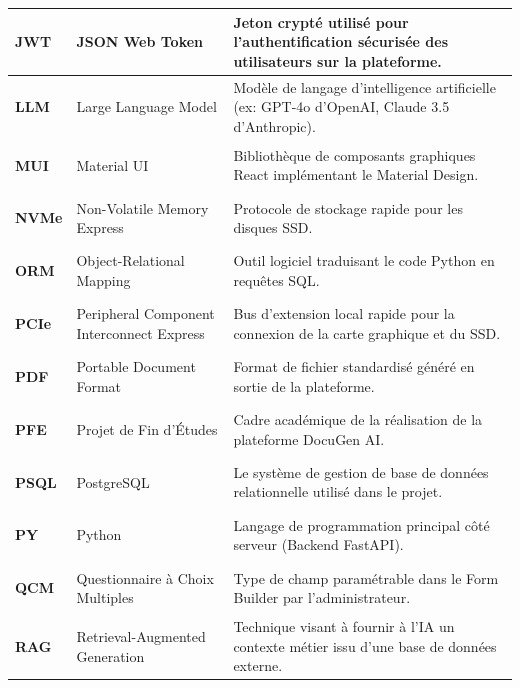 \documentclass[12pt, a4paper]{report}
\begin{document}
\begin{longtable}{|p{2.5cm}|p{5.5cm}|p{\dimexpr\textwidth-8.8cm}|}
    \hypertarget{acr:18}{}\textbf{JWT} & JSON Web Token & Jeton crypté utilisé pour l'authentification sécurisée des utilisateurs sur la plateforme. \\ \hline
    
    \hypertarget{acr:19}{}\textbf{LLM} & Large Language Model & Modèle de langage d'intelligence artificielle (ex: GPT-4o d'OpenAI, Claude 3.5 d'Anthropic). \\ \hline
    
    \hypertarget{acr:20}{}\textbf{MUI} & Material UI & Bibliothèque de composants graphiques React implémentant le Material Design. \\ \hline
    
    \hypertarget{acr:21}{}\textbf{NVMe} & Non-Volatile Memory Express & Protocole de stockage rapide pour les disques SSD. \\ \hline
    
    \hypertarget{acr:22}{}\textbf{ORM} & Object-Relational Mapping & Outil logiciel traduisant le code Python en requêtes SQL. \\ \hline
    
    \hypertarget{acr:23}{}\textbf{PCIe} & Peripheral Component Interconnect Express & Bus d'extension local rapide pour la connexion de la carte graphique et du SSD. \\ \hline
    
    \hypertarget{acr:24}{}\textbf{PDF} & Portable Document Format & Format de fichier standardisé généré en sortie de la plateforme. \\ \hline
    
    \hypertarget{acr:25}{}\textbf{PFE} & Projet de Fin d'Études & Cadre académique de la réalisation de la plateforme DocuGen AI. \\ \hline
    
    \hypertarget{acr:26}{}\textbf{PSQL} & PostgreSQL & Le système de gestion de base de données relationnelle utilisé dans le projet. \\ \hline
    
    \hypertarget{acr:27}{}\textbf{PY} & Python & Langage de programmation principal côté serveur (Backend FastAPI). \\ \hline
    
    \hypertarget{acr:28}{}\textbf{QCM} & Questionnaire à Choix Multiples & Type de champ paramétrable dans le Form Builder par l'administrateur. \\ \hline
    
    \hypertarget{acr:29}{}\textbf{RAG} & Retrieval-Augmented Generation & Technique visant à fournir à l'IA un contexte métier issu d'une base de données externe. \\ \hline
    

\end{longtable}
\end{document}
